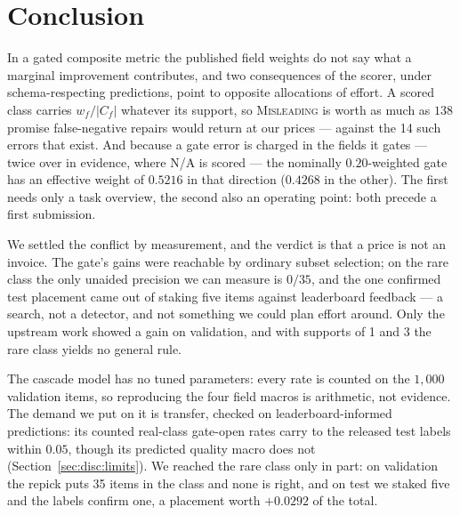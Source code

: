 \section{Conclusion}
\label{sec:conclusion}

In a gated composite metric the published field weights do not say what a marginal improvement
contributes, and two consequences of the scorer, under schema-respecting predictions, point to
opposite allocations of effort. A scored
class carries $w_f/|C_f|$ whatever its support, so \textsc{Misleading} is worth as much as $138$
promise false-negative repairs would return at our prices --- against the 14 such errors that exist. And because a gate
error is charged in the fields it gates --- twice over in evidence, where N/A is scored --- the
nominally $0.20$-weighted gate has an effective weight of $0.5216$ in that direction ($0.4268$ in
the other). The first needs only a
task overview, the second also an operating point: both precede a first submission.

We settled the conflict by measurement, and the verdict is that a price is not an invoice. The
gate's gains were reachable by ordinary subset selection; on the rare class the only unaided
precision we can measure is $0/35$, and the one confirmed test placement came out of staking five
items against leaderboard feedback --- a search, not a detector, and not something we could plan
effort around. Only the upstream work showed a gain on validation, and with supports of 1 and 3
the rare class yields no general rule.

The cascade model has no tuned parameters: every rate is counted on the $1{,}000$ validation
items, so reproducing the four field macros is arithmetic, not evidence. The demand we put on it is
transfer, checked on leaderboard-informed predictions: its counted real-class gate-open rates carry to the released test labels within $0.05$, though its
predicted quality macro does not (Section~\ref{sec:disc:limits}). We reached the rare
class only in part: on validation the repick puts 35 items in the class and none is right, and on
test we staked five and the labels confirm one, a placement worth $+0.0292$ of the total.

